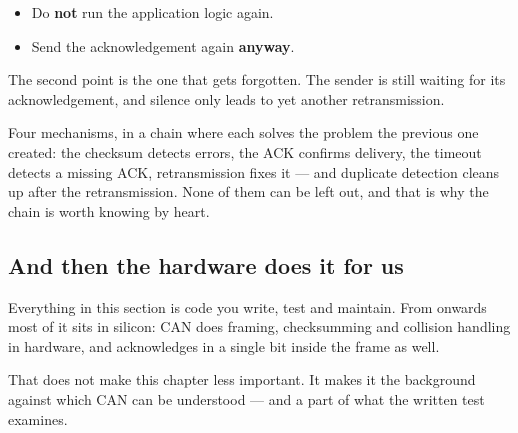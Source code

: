 \begin{itemize}
  \item Do \textbf{not} run the application logic again.
  \item Send the acknowledgement again \textbf{anyway}.
\end{itemize}

The second point is the one that gets forgotten. The sender is still waiting for its
acknowledgement, and silence only leads to yet another retransmission.

\begin{aside}
\note Four mechanisms, in a chain where each solves the problem the previous one created: the
checksum detects errors, the ACK confirms delivery, the timeout detects a missing ACK,
retransmission fixes it --- and duplicate detection cleans up after the retransmission. None of
them can be left out, and that is why the chain is worth knowing by heart.
\end{aside}

\subsection{And then the hardware does it for us}

Everything in this section is code you write, test and maintain. From  onwards
most of it sits in silicon: CAN does framing, checksumming and collision handling in hardware,
and acknowledges in a single bit inside the frame as well.

That does not make this chapter less important. It makes it the background against which CAN can
be understood --- and a part of what the written test examines.
